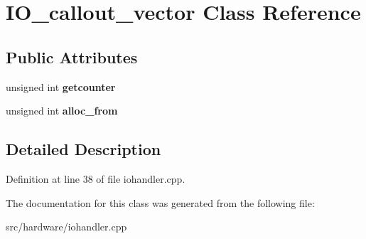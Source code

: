 \hypertarget{classIO__callout__vector}{\section{I\-O\-\_\-callout\-\_\-vector Class Reference}
\label{classIO__callout__vector}
}
\subsection*{Public Attributes}
\begin{DoxyCompactItemize}
\item 
\hypertarget{classIO__callout__vector_a74d7b16f743af27458e41ee1e79d0373}{unsigned int {\bfseries getcounter}}\label{classIO__callout__vector_a74d7b16f743af27458e41ee1e79d0373}

\item 
\hypertarget{classIO__callout__vector_a243f5d6a635e92afbe95c4738efc8a7b}{unsigned int {\bfseries alloc\-\_\-from}}\label{classIO__callout__vector_a243f5d6a635e92afbe95c4738efc8a7b}

\end{DoxyCompactItemize}


\subsection{Detailed Description}


Definition at line 38 of file iohandler.\-cpp.



The documentation for this class was generated from the following file\-:\begin{DoxyCompactItemize}
\item 
src/hardware/iohandler.\-cpp\end{DoxyCompactItemize}
